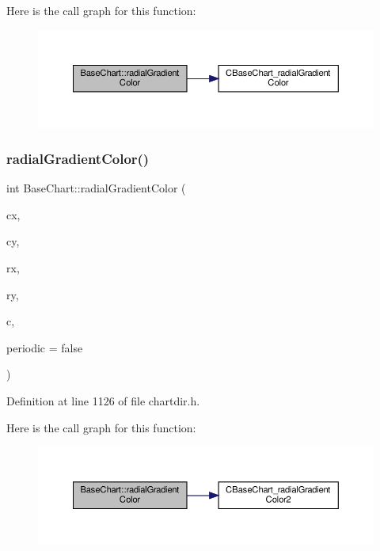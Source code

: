 Here is the call graph for this function\+:
\nopagebreak
\begin{figure}[H]
\begin{center}
\leavevmode
\includegraphics[width=350pt]{class_base_chart_ad6996ebdeebe20e9a709726867bc5b77_cgraph}
\end{center}
\end{figure}
\mbox{\label{class_base_chart_aa214991698053b844aac4aa621dd6511}} 
\subsubsection{\texorpdfstring{radial\+Gradient\+Color()}{radialGradientColor()}\hspace{0.1cm}{\footnotesize\ttfamily [2/2]}}
{\footnotesize\ttfamily int Base\+Chart\+::radial\+Gradient\+Color (\begin{DoxyParamCaption}\item[{int}]{cx,  }\item[{int}]{cy,  }\item[{int}]{rx,  }\item[{int}]{ry,  }\item[{\hyperlink{class_int_array}{Int\+Array}}]{c,  }\item[{bool}]{periodic = {\ttfamily false} }\end{DoxyParamCaption})\hspace{0.3cm}{\ttfamily [inline]}}



Definition at line 1126 of file chartdir.\+h.

Here is the call graph for this function\+:
\nopagebreak
\begin{figure}[H]
\begin{center}
\leavevmode
\includegraphics[width=350pt]{class_base_chart_aa214991698053b844aac4aa621dd6511_cgraph}
\end{center}
\end{figure}
\mbox{\label{class_base_chart_a89dc9e3a549543beff75c430c42887ca}} 
